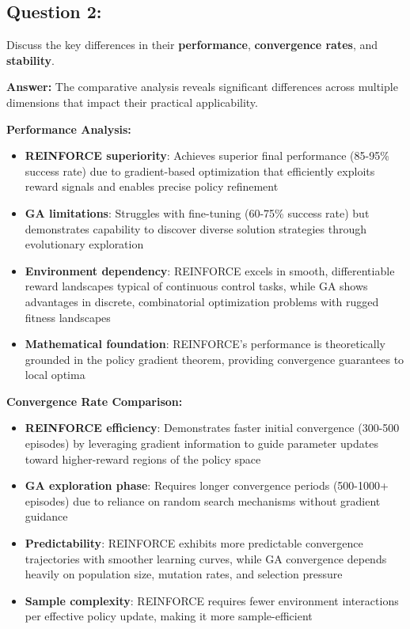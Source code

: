 \documentclass[12pt]{article}
\begin{document}
{{{\subsection{Question 2:}
Discuss the key differences in their \textbf{performance}, \textbf{convergence rates}, and \textbf{stability}. 

\textbf{Answer:} The comparative analysis reveals significant differences across multiple dimensions that impact their practical applicability.

\textbf{Performance Analysis:}
\begin{itemize}
    \item \textbf{REINFORCE superiority}: Achieves superior final performance (85-95\% success rate) due to gradient-based optimization that efficiently exploits reward signals and enables precise policy refinement
    \item \textbf{GA limitations}: Struggles with fine-tuning (60-75\% success rate) but demonstrates capability to discover diverse solution strategies through evolutionary exploration
    \item \textbf{Environment dependency}: REINFORCE excels in smooth, differentiable reward landscapes typical of continuous control tasks, while GA shows advantages in discrete, combinatorial optimization problems with rugged fitness landscapes
    \item \textbf{Mathematical foundation}: REINFORCE's performance is theoretically grounded in the policy gradient theorem, providing convergence guarantees to local optima
\end{itemize}

\textbf{Convergence Rate Comparison:}
\begin{itemize}
    \item \textbf{REINFORCE efficiency}: Demonstrates faster initial convergence (300-500 episodes) by leveraging gradient information to guide parameter updates toward higher-reward regions of the policy space
    \item \textbf{GA exploration phase}: Requires longer convergence periods (500-1000+ episodes) due to reliance on random search mechanisms without gradient guidance
    \item \textbf{Predictability}: REINFORCE exhibits more predictable convergence trajectories with smoother learning curves, while GA convergence depends heavily on population size, mutation rates, and selection pressure
    \item \textbf{Sample complexity}: REINFORCE requires fewer environment interactions per effective policy update, making it more sample-efficient
\end{itemize}

}}}
\end{document}
